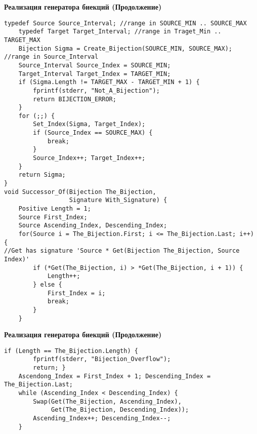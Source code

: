 


%
\begin{center}
\small\textbf{Реализация генератора биекций (Продолжение)}
\end{center}
\dotfill

\begin{lstlisting}[mathescape=true, frame=lr]
    typedef Source Source_Interval; //range in SOURCE_MIN .. SOURCE_MAX
    typedef Target Target_Interval; //range in Traget_Min .. TARGET_MAX
    Bijection Sigma = Create_Bijection(SOURCE_MIN, SOURCE_MAX); //range in Source_Interval
    Source_Interval Source_Index = SOURCE_MIN;
    Target_Interval Target_Index = TARGET_MIN;
    if (Sigma.Length != TARGET_MAX - TARGET_MIN + 1) {
        fprintf(stderr, "Not_A_Bijection");
        return BIJECTION_ERROR;
    }
    for (;;) {
        Set_Index(Sigma, Target_Index);
        if (Source_Index == SOURCE_MAX) {
            break;
        }
        Source_Index++; Target_Index++;
    }
    return Sigma;
}
void Successor_Of(Bijection The_Bijection, 
                  Signature With_Signature) {
    Positive Length = 1;
    Source First_Index;
    Source Ascending_Index, Descending_Index;
    for(Source i = The_Bijection.First; i <= The_Bijection.Last; i++) {
//Get has signature 'Source * Get(Bijection The_Bijection, Source Index)'
        if (*Get(The_Bijection, i) > *Get(The_Bijection, i + 1)) {
            Length++;
        } else {
            First_Index = i;
            break;
        }
    }
\end{lstlisting}
\dotfill
\newpage
\begin{center}
\small\textbf{Реализация генератора биекций (Продолжение)}
\end{center}
\dotfill   
\begin{lstlisting}[mathescape=true, frame=lbr]
    if (Length == The_Bijection.Length) {
        fprintf(stderr, "Bijection_Overflow");
        return; }    
    Ascendong_Index = First_Index + 1; Descending_Index = The_Bijection.Last;
    while (Ascending_Index < Descending_Index) {
        Swap(Get(The_Bijection, Ascending_Index), 
             Get(The_Bijection, Descending_Index));
        Ascending_Index++; Descending_Index--;
    }   
\end{lstlisting}

